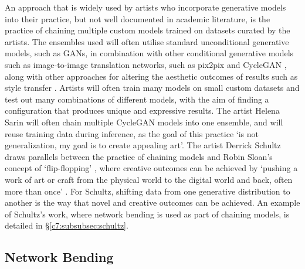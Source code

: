 An approach that is widely used by artists who incorporate generative models into their practice, but not well documented in academic literature, is the practice of chaining multiple custom models trained on datasets curated by the artists. 
The ensembles used will often utilise standard unconditional generative models, such as GANs, in combination with other conditional generative models such as image-to-image translation networks, such as pix2pix \citep{isola2017image} and CycleGAN \citep{zhu2017unpaired}, along with other approaches for altering the aesthetic outcomes of results such as style transfer \citep{gatys2016neural}. 
Artists will often train many models on small custom datasets and test out many combinations of different models, with the aim of finding a configuration that produces unique and expressive results. 
The artist Helena Sarin will often chain multiple CycleGAN models into one ensemble, and will reuse training data during inference, as the goal of this practice `is not generalization, my goal is to create appealing art'\citep{sarin2018playing}. 
The artist Derrick Schultz draws parallels between the practice of chaining models and Robin Sloan's concept of `flip-flopping' \citep{schultz2021personal}, where creative outcomes can be achieved by `pushing a work of art or craft from the physical world to the digital world and back, often more than once' \citep{sloan2012flipflop}. 
For Schultz, shifting data from one generative distribution to another is the way that novel and creative outcomes can be achieved. 
An example of Schultz's work, where network bending is used as part of chaining models, is detailed in \S \ref{c7:subsubsec:schultz}.


\subsection{Network Bending}
\label{survey:bending}

